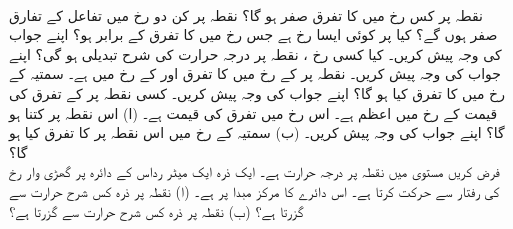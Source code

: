 \\
نقطہ  پر کس رخ میں   کا تفرق صفر ہو گا؟
نقطہ  پر کن دو رخ میں  تفاعل  کے تفارق  صفر ہوں گے؟
کیا  پر کوئی  ایسا رخ  ہے جس رخ میں    کا تفرق  کے برابر ہو؟ اپنے جواب کی وجہ پیش کریں۔
کیا کسی رخ ،  نقطہ  پر  درجہ حرارت     کی شرح تبدیلی  ہو گی؟ اپنے جواب کی وجہ پیش کریں۔
نقطہ  پر   کے  رخ   میں  کا تفرق   اور  کے  رخ  میں  ہے۔   سمتیہ    کے رخ  میں  کا تفرق کیا ہو گا؟ اپنے جواب کی وجہ پیش کریں۔
کسی نقطہ پر  کے تفرق کی قیمت  کے  رخ   میں اعظم ہے۔ اس رخ میں  تفرق کی قیمت  ہے۔ (ا) اس نقطہ پر  کتنا ہو گا؟ اپنے جواب کی وجہ پیش کریں۔ (ب) سمتیہ    کے رخ میں   اس نقطہ پر   کا تفرق کیا ہو گا؟
\\
فرض کریں مستوی  میں  نقطہ   پر درجہ حرارت    ہے۔  ایک ذرہ  ایک میٹر رداس کے دائرہ پر  گھڑی وار رخ   کی  رفتار سے حرکت کرتا ہے۔ اس دائرے کا مرکز مبدا پر ہے۔ (ا)  نقطہ  پر  ذرہ  کس شرح حرارت    سے گزرتا ہے؟ (ب)     نقطہ  پر  ذرہ  کس شرح حرارت    سے گزرتا ہے؟ 

